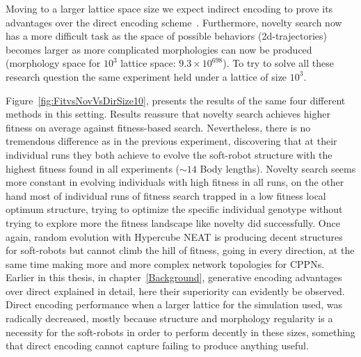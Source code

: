 Moving to a larger lattice space size we expect indirect encoding to prove its advantages over the direct encoding scheme~\cite{cheney2013unshackling,stanley2007compositional}. Furthermore, novelty search now has a more difficult task as the space of possible behaviors (2d-trajectories) becomes larger as more complicated morphologies can now be produced (morphology space for $10^3$ lattice space: $9.3 \times 10^{698}$). To try to solve all these research question the same experiment held under a lattice of size $10^3$. 

Figure~\ref{fig:FitvsNovVsDirSize10}, presents the results of the same four different methods in this setting. Results reassure that novelty search achieves higher fitness on average against fitness-based search. Nevertheless, there is no tremendous difference as in the previous experiment, discovering that at their individual runs they both achieve to evolve the soft-robot structure with the highest fitness found in all experiments ($\sim 14$ Body lengths). Novelty search seems more constant in evolving individuals with high fitness in all runs, on the other hand most of individual runs of fitness search trapped in a low fitness local optimum structure, trying to optimize the specific individual genotype without trying to explore more the fitness landscape like novelty did successfully. Once again, random evolution with Hypercube NEAT is producing decent structures for soft-robots but cannot climb the hill of fitness, going in every direction, at the same time making more and more complex network topologies for CPPNs. Earlier in this thesis, in chapter~\ref{Background}, generative encoding advantages over direct explained in detail, here their superiority can evidently be observed. Direct encoding performance when a larger lattice for the simulation used, was radically decreased, mostly because structure and morphology regularity is a necessity for the soft-robots in order to perform decently in these sizes, something that direct encoding cannot capture failing to produce anything useful.






